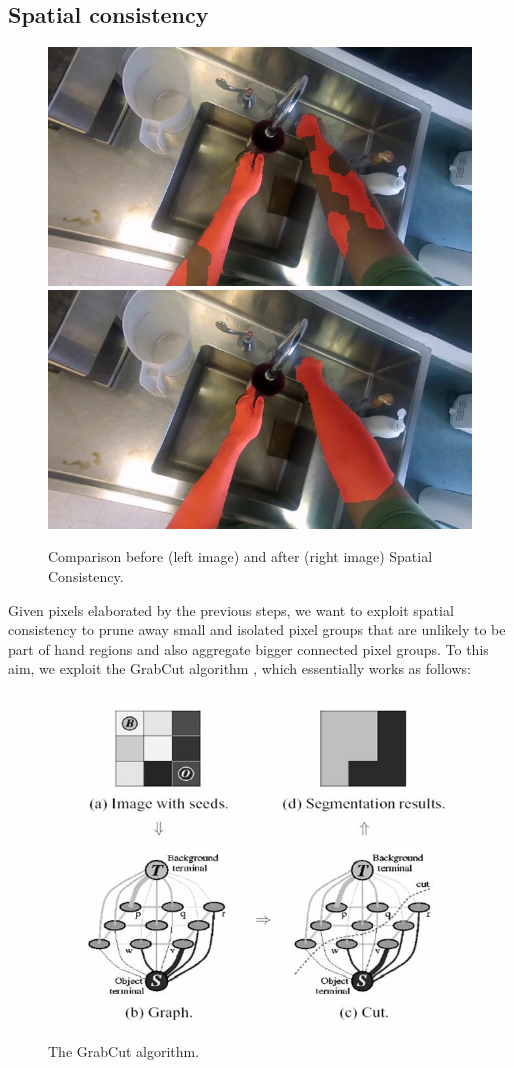 \subsection{Spatial consistency}
\begin{figure}[tb]
\centering
\includegraphics[width=.45\columnwidth]{./Figures/context-free1.jpg}
\includegraphics[width=.45\columnwidth]{./Figures/context-dependent1.jpg}
\caption{Comparison before (left image) and after (right image) Spatial Consistency.}
\label{fig:gesture_samples_space}
\end{figure}
Given pixels elaborated by the previous steps, we want to exploit spatial consistency to prune away small and isolated pixel groups that are unlikely to be part of hand regions and also aggregate bigger connected pixel groups. To this aim, we exploit the GrabCut algorithm \cite{rother04}, which essentially works as follows:

\begin{figure}[htbp]
	\centering
		\includegraphics[width=.55\linewidth]{Figures/grabcut.jpg}
	\caption{The GrabCut algorithm.}
	\label{fig:GrabCut}
\end{figure}
 
